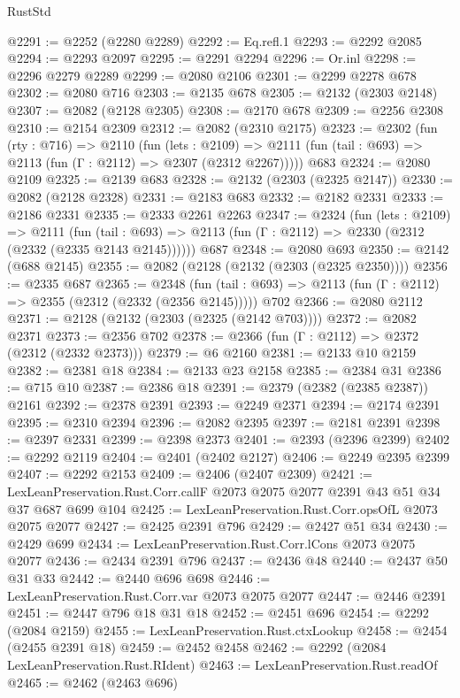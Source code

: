 \begin{lexlean}{RustStd}
\begin{coremodule}
@2291 := @2252 (@2280 @2289)
@2292 := Eq.refl.{1}
@2293 := @2292 @2085
@2294 := @2293 @2097
@2295 := @2291 @2294
@2296 := Or.inl
@2298 := @2296 @2279 @2289
@2299 := @2080 @2106
@2301 := @2299 @2278 @678
@2302 := @2080 @716
@2303 := @2135 @678
@2305 := @2132 (@2303 @2148)
@2307 := @2082 (@2128 @2305)
@2308 := @2170 @678
@2309 := @2256 @2308
@2310 := @2154 @2309
@2312 := @2082 (@2310 @2175)
@2323 := @2302
    (fun (rty : @716) =>
    @2110
      (fun (lets : @2109) =>
      @2111 (fun (tail : @693) => @2113 (fun (Γ : @2112) => @2307 (@2312 @2267)))))
    @683
@2324 := @2080 @2109
@2325 := @2139 @683
@2328 := @2132 (@2303 (@2325 @2147))
@2330 := @2082 (@2128 @2328)
@2331 := @2183 @683
@2332 := @2182 @2331
@2333 := @2186 @2331
@2335 := @2333 @2261 @2263
@2347 := @2324
    (fun (lets : @2109) =>
    @2111
      (fun (tail : @693) => @2113 (fun (Γ : @2112) => @2330 (@2312 (@2332 (@2335 @2143 @2145))))))
    @687
@2348 := @2080 @693
@2350 := @2142 (@688 @2145)
@2355 := @2082 (@2128 (@2132 (@2303 (@2325 @2350))))
@2356 := @2335 @687
@2365 := @2348
    (fun (tail : @693) => @2113 (fun (Γ : @2112) => @2355 (@2312 (@2332 (@2356 @2145)))))
    @702
@2366 := @2080 @2112
@2371 := @2128 (@2132 (@2303 (@2325 (@2142 @703))))
@2372 := @2082 @2371
@2373 := @2356 @702
@2378 := @2366 (fun (Γ : @2112) => @2372 (@2312 (@2332 @2373)))
@2379 := @6 @2160
@2381 := @2133 @10 @2159
@2382 := @2381 @18
@2384 := @2133 @23 @2158
@2385 := @2384 @31
@2386 := @715 @10
@2387 := @2386 @18
@2391 := @2379 (@2382 (@2385 @2387)) @2161
@2392 := @2378 @2391
@2393 := @2249 @2371
@2394 := @2174 @2391
@2395 := @2310 @2394
@2396 := @2082 @2395
@2397 := @2181 @2391
@2398 := @2397 @2331
@2399 := @2398 @2373
@2401 := @2393 (@2396 @2399)
@2402 := @2292 @2119
@2404 := @2401 (@2402 @2127)
@2406 := @2249 @2395 @2399
@2407 := @2292 @2153
@2409 := @2406 (@2407 @2309)
@2421 := LexLeanPreservation.Rust.Corr.callF @2073 @2075 @2077 @2391 @43 @51 @34 @37 @687 @699 @104
@2425 := LexLeanPreservation.Rust.Corr.opsOfL @2073 @2075 @2077
@2427 := @2425 @2391 @796
@2429 := @2427 @51 @34
@2430 := @2429 @699
@2434 := LexLeanPreservation.Rust.Corr.lCons @2073 @2075 @2077
@2436 := @2434 @2391 @796
@2437 := @2436 @48
@2440 := @2437 @50 @31 @33
@2442 := @2440 @696 @698
@2446 := LexLeanPreservation.Rust.Corr.var @2073 @2075 @2077
@2447 := @2446 @2391
@2451 := @2447 @796 @18 @31 @18
@2452 := @2451 @696
@2454 := @2292 (@2084 @2159)
@2455 := LexLeanPreservation.Rust.ctxLookup
@2458 := @2454 (@2455 @2391 @18)
@2459 := @2452 @2458
@2462 := @2292 (@2084 LexLeanPreservation.Rust.RIdent)
@2463 := LexLeanPreservation.Rust.readOf
@2465 := @2462 (@2463 @696)

\end{coremodule}
\end{lexlean}
